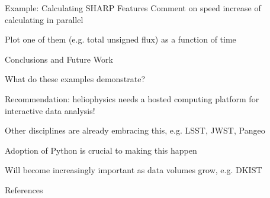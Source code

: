 \documentclass[final]{beamer}
\newlength{\sepwidth}
\newlength{\colwidth}
\newcommand{\separatorcolumn}{\begin{column}{\sepwidth}\end{column}}
\begin{document}
\begin{frame}[t]
\begin{columns}[t]
\begin{column}{\colwidth}
\begin{block}{Example: Calculating SHARP Features}
    Comment on speed increase of calculating in parallel

    Plot one of them (e.g. total unsigned flux) as a function of time

  \end{block}

  \begin{block}{Conclusions and Future Work}

    What do these examples demonstrate?

    Recommendation: heliophysics needs a hosted computing platform for interactive data analysis!

    Other disciplines are already embracing this, e.g. LSST, JWST, Pangeo

    Adoption of Python is crucial to making this happen 

    Will become increasingly important as data volumes grow, e.g. DKIST

  \end{block}

  \begin{block}{References}

    \scriptsize
      \begin{multicols}{2}
        
        
      \end{multicols}

  \end{block}

\end{column}

\separatorcolumn
\end{columns}
\end{frame}
\end{document}

